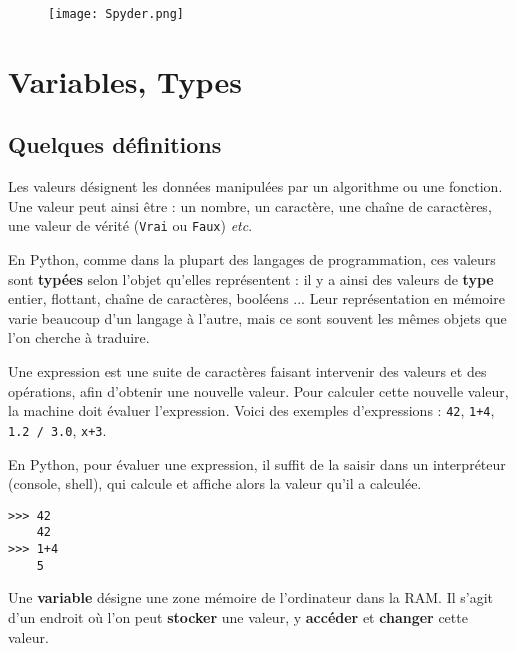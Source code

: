 \begin{figure}[H]
\centering
\texttt{[image: Spyder.png]}
\end{figure}

\section{Variables, Types}

\subsection{Quelques définitions}
\begin{defi}[Valeurs]
Les valeurs désignent les données manipulées par un algorithme ou une fonction. Une valeur 
peut ainsi être  : un nombre, un caractère, une chaîne de caractères, une valeur de vérité 
(\lstinline{Vrai} ou \lstinline{Faux}) \textit{etc}.

En Python, comme dans la plupart des langages de programmation, ces valeurs sont \textbf{typées} selon l'objet qu'elles représentent : il y a ainsi des valeurs de \textbf{type} entier, flottant, chaîne de caractères, booléens ...   Leur représentation en mémoire varie beaucoup d'un langage à l'autre, mais ce sont souvent les mêmes objets que l'on 
cherche à traduire.
\end{defi}

\begin{defi}[Expression]
Une expression est une suite de caractères faisant intervenir des valeurs et des 
opérations, afin d'obtenir une nouvelle valeur. Pour calculer cette nouvelle valeur,
la machine doit {évaluer} l'expression. Voici des exemples d'expressions : \lstinline{42}, \lstinline{1+4}, 
\lstinline{1.2 / 3.0}, \lstinline{x+3}.
\end{defi}

En Python, pour évaluer une expression, il suffit de la saisir dans un interpréteur (console, shell), qui
calcule et affiche alors la valeur qu'il a calculée.
\begin{lstlisting}
>>> 42
	42
>>> 1+4
	5
\end{lstlisting}


\begin{defi}[Variable]
Une \textbf{variable} désigne une zone mémoire de l'ordinateur dans la RAM.
Il s'agit d'un endroit où l'on peut \textbf{stocker} une valeur, y \textbf{accéder} et 
\textbf{changer} cette valeur.
\end{defi}

